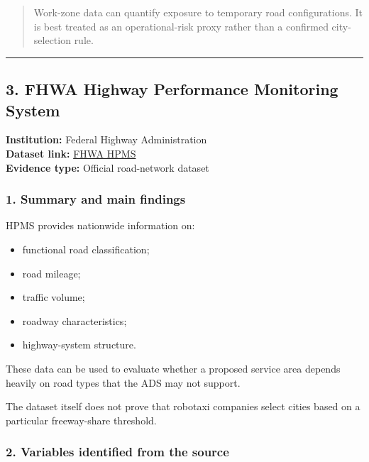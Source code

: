 \documentclass[10pt,a4paper]{article}
\providecommand{\tightlist}{\setlength{\itemsep}{0pt}\setlength{\parskip}{0pt}}
\begin{document}
\begin{quote}
Work-zone data can quantify exposure to temporary road configurations. It is best treated as an operational-risk proxy rather than a confirmed city-selection rule.
\end{quote}

\begin{center}\rule{0.5\linewidth}{0.5pt}\end{center}

\hypertarget{fhwa-highway-performance-monitoring-system}{%
\subsection{3. FHWA Highway Performance Monitoring System}\label{fhwa-highway-performance-monitoring-system}}

\textbf{Institution:} Federal Highway Administration\\
\textbf{Dataset link:} \href{https://www.fhwa.dot.gov/policyinformation/hpms.cfm}{FHWA HPMS}\\
\textbf{Evidence type:} Official road-network dataset

\hypertarget{summary-and-main-findings-6}{%
\subsubsection{1. Summary and main findings}\label{summary-and-main-findings-6}}

HPMS provides nationwide information on:

\begin{itemize}
\tightlist
\item
  functional road classification;
\item
  road mileage;
\item
  traffic volume;
\item
  roadway characteristics;
\item
  highway-system structure.
\end{itemize}

These data can be used to evaluate whether a proposed service area depends heavily on road types that the ADS may not support.

The dataset itself does not prove that robotaxi companies select cities based on a particular freeway-share threshold.

\hypertarget{variables-identified-from-the-source-6}{%
\subsubsection{2. Variables identified from the source}\label{variables-identified-from-the-source-6}}
\end{document}
